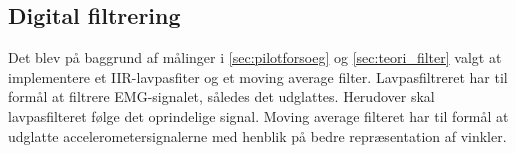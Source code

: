\subsection{Digital filtrering}
Det blev på baggrund af målinger i \autoref{sec:pilotforsoeg} og \autoref{sec:teori_filter} valgt at implementere et IIR-lavpasfiter og et moving average filter. 
Lavpasfiltreret har til formål at filtrere EMG-signalet, således det udglattes. Herudover skal lavpasfilteret følge det oprindelige signal. Moving average filteret har til formål at udglatte accelerometersignalerne med henblik på bedre repræsentation af vinkler. 